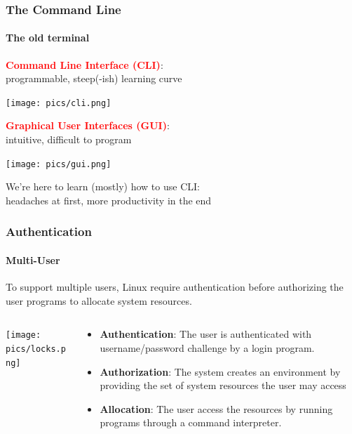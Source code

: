 \documentclass[unknownkeysallowed, 10pt, a4 paper, handout]{beamer}
\newcommand{\focus}[1]{\textbf{\textcolor{red}{#1}}}
\newcommand{\sidebyside}[5]{
  \begin{minipage}{#1\textwidth}
    #2
  \end{minipage} #3 \begin{minipage}{#4\textwidth}
    #5
  \end{minipage}
}
\begin{document}
\begin{frame}[c]
  \begin{center}
    \frametitle{The Command Line}
    \framesubtitle{The old terminal}

    \sidebyside{0.54}{
      \focus{Command Line Interface (CLI)}:\\
             programmable, steep(-ish) learning curve
    }{\hfill}{0.41}{
      \texttt{[image: pics/cli.png]}
    }

    \sidebyside{0.54}{
      \focus{Graphical User Interfaces (GUI)}:\\
      intuitive, difficult to program
    }{\hfill}{0.41}{
      \texttt{[image: pics/gui.png]}
    }

    \vspace{-2mm}

    We're here to learn (mostly) how to use CLI:\\
    headaches at first, more productivity in the end

  \end{center}
\end{frame}


\begin{frame}[label=login]
  \frametitle{Authentication}
  \framesubtitle{Multi-User}
  To support multiple users, Linux require authentication before
  authorizing the user programs to allocate system resources.
  \begin{columns}[T]
    \begin{column}{.23\textwidth}
      \begin{center}
        \texttt{[image: pics/locks.png]}
      \end{center}
    \end{column}
    \hfill
    \begin{column}{.66\textwidth}
    \vspace{5mm}
    \small{
      \begin{itemize}
        \item \textbf{Authentication}: The user is authenticated with
          username/password challenge by a login program.
        \item \textbf{Authorization}: The system creates an environment
          by providing the set of system resources the user may access 
        \item \textbf{Allocation}: The user access the resources by
          running programs through a command interpreter.
      \end{itemize}
      }
    \end{column}
  \end{columns}
\end{frame}
\end{document}
